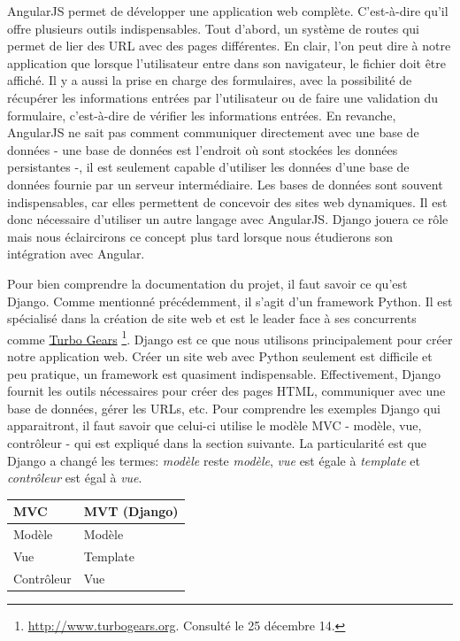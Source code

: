 \documentclass[a4paper,10pt,twoside]{sphinxmanual}
\begin{document}
AngularJS permet de développer une application web complète. C'est-à-dire qu'il offre plusieurs outils indispensables. Tout d'abord, un système de routes qui permet de lier des URL avec des pages différentes. En clair, l'on peut dire à notre application que lorsque l'utilisateur entre  dans son navigateur, le fichier  doit être affiché. Il y a aussi la prise en charge des formulaires, avec la possibilité de récupérer les informations entrées par l'utilisateur ou de faire une validation du formulaire, c'est-à-dire de vérifier les informations entrées. En revanche, AngularJS ne sait pas comment communiquer directement avec une base de données - une base de données est l'endroit où sont stockées les données persistantes -, il est seulement capable d'utiliser les données d'une base de données fournie par un serveur intermédiaire. Les bases de données sont souvent indispensables, car elles permettent de concevoir des sites web dynamiques. Il est donc nécessaire d'utiliser un autre langage avec AngularJS. Django jouera ce rôle mais nous éclaircirons ce concept plus tard lorsque nous étudierons son intégration avec Angular.

Pour bien comprendre la documentation du projet, il faut savoir ce qu'est Django. Comme mentionné précédemment, il s'agit d'un framework Python. Il est spécialisé dans la création de site web et est le leader face à ses concurrents comme \href{http://www.turbogears.org/}{Turbo Gears} \footnote{
\href{http://www.turbogears.org}{http://www.turbogears.org}. Consulté le 25 décembre 14.
}. Django est ce que nous utilisons principalement pour créer notre application web. Créer un site web avec Python seulement est difficile et peu pratique, un framework est  quasiment indispensable. Effectivement, Django fournit les outils nécessaires pour créer des pages HTML, communiquer avec une base de données, gérer les URLs, etc. Pour comprendre les exemples Django qui apparaitront, il faut savoir que celui-ci utilise le modèle MVC - modèle, vue, contrôleur - qui est expliqué dans la section suivante. La particularité est que Django a changé les termes: \emph{modèle} reste \emph{modèle}, \emph{vue} est égale à \emph{template} et \emph{contrôleur} est égal à \emph{vue}.

\begin{tabulary}{\linewidth}{|L|L|}
\hline
\textsf{\relax 
MVC
} & \textsf{\relax 
MVT (Django)
}\\
\hline
Modèle
 & 
Modèle
\\

Vue
 & 
Template
\\

Contrôleur
 & 
Vue
\\
\hline\end{tabulary}
\end{document}
